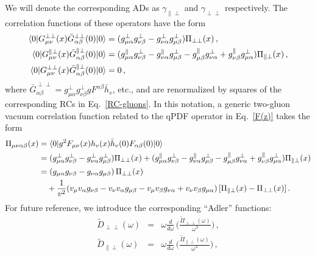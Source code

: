 \documentclass[12pt]{article}
\numberwithin{equation}{section}
\newcommand{\1}[1]{\mathbf{1}^{#1}}
\newcommand{\2}[1]{\mathbf{2}^{#1}}
\newcommand{\3}[1]{\mathbf{3}^{#1}}
\newcommand{\4}[1]{\mathbf{4}^{#1}}
\newcommand{\5}[1]{\mathbf{5}^{#1}}
\newcommand{\tPi}{\tilde{\Pi}}
\newcommand{\tD}{\tilde{D}}
\newcommand{\EQN}[1]{\hspace{3mm}\fbox{\fbox{$#1$}} \label{#1}}
\newcommand{\mlabel}[1]{ \text{\footnotesize \hspace{3mm}\fbox{\fbox{$#1$}} \label{#1}}}
\renewcommand{\EQN}[1]{\mlabel{#1}}
\renewcommand{\mlabel}[1]{\label{#1}}
\renewcommand{\EQN}[1]{\label{#1}}
\newcommand{\ga}{\gamma}
\newcommand{\om}{\omega}
\newcommand{\TT}{{\perp\perp}}
\newcommand{\PT}{{\parallel\perp}}
\begin{document}
We will denote the corresponding ADs as $\ga_\PT$ and $\ga_\TT$ respectively. 
The correlation functions of these operators have the form
\begin{align}
 \langle 0| G^{\perp\perp}_{\mu\nu}(x)  \bar G^{\perp\perp}_{\alpha\beta}(0) |0 \rangle 
&=  (g^\perp_{\mu\alpha}g^\perp_{\nu\beta} - g^\perp_{\nu\alpha}g^\perp_{\mu\beta}) \Pi_{\perp\perp}(x) \,,
\notag\\
 \langle 0| G^{\parallel\perp}_{\mu\nu}(x)  \bar G^{\parallel\perp}_{\alpha\beta}(0) |0 \rangle
&= (g^\parallel_{\mu\alpha} g^\perp_{\nu\beta} -  g^\parallel_{\nu\alpha} g^\perp_{\mu\beta}
- g^\parallel_{\mu\beta} g^\perp_{\nu\alpha} +  g^\parallel_{\nu\beta} g^\perp_{\mu\alpha})\Pi_{\parallel\perp}(x) \,,
\notag\\
 \langle 0| G^{\perp\perp}_{\mu\nu}(x)  \bar G^{\parallel\perp}_{\alpha\beta}(0) |0 \rangle
&= 0\,,  
\end{align}
where $\bar  G^{\perp\perp}_{\alpha\beta} = g^\perp_{\mu\alpha}  g^\perp_{\nu\beta} g F^{\alpha\beta} \bar h_v$, etc., and are renormalized by squares of the corresponding RCs in Eq.~\eqref{RC-gluons}. 
In this notation, a generic two-gluon vacuum correlation function related to the qPDF operator in Eq.~\eqref{F(z)} 
takes the form
\begin{align}
 \Pi_{\mu\nu\alpha\beta}(x) &= \langle 0| g^2 F_{\mu\nu}(x) h_v(x) \bar h_v(0) F_{\alpha\beta}(0)|0\rangle
\notag\\&=
(g^\perp_{\mu\alpha}g^\perp_{\nu\beta} - g^\perp_{\nu\alpha}g^\perp_{\mu\beta}) \Pi_{\perp\perp}(x) 
+ (g^\parallel_{\mu\alpha} g^\perp_{\nu\beta} -  g^\parallel_{\nu\alpha} g^\perp_{\mu\beta}
- g^\parallel_{\mu\beta} g^\perp_{\nu\alpha} +  g^\parallel_{\nu\beta} g^\perp_{\mu\alpha})\Pi_{\parallel\perp}(x)  
\notag\\&=
(g_{\mu\alpha}g_{\nu\beta} - g_{\nu\alpha}g_{\mu\beta})\, \Pi_{\perp\perp}(x)
\notag\\&\quad
+  \frac{1}{v^2}( v_\mu v_\alpha g_{\nu\beta} -  v_\nu v_\alpha g_{\mu\beta}
-v_\mu v_\beta g_{\nu\alpha} +  v_\nu v_\beta g_{\mu\alpha})\, [\Pi_{\parallel\perp}(x) - \Pi_{\perp\perp}(x)]\,.   
\end{align}
For future reference, we introduce the corresponding ``Adler'' functions:
\begin{eqnarray}
\tD_\TT(\om) &=&  \om \frac{d}{d \om} \,\Biggl(  \frac{ \tPi_\TT(\om)}{\om^3} \Biggr)\,,
\nonumber\\
\tD_\PT(\om) &=&  \om \frac{d}{d \om} \,\Biggl(  \frac{ \tPi_\PT(\om)}{\om^3} \Biggr)\,,
\end{eqnarray}
\end{document}
